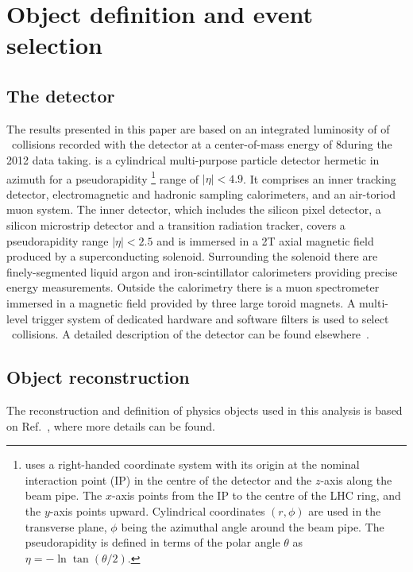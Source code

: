 \documentclass{atlasnote}
\begin{document}
\section{Object definition and event selection}
\label{sec:selection}

\subsection{The \ATLAS detector}
The results presented in this paper are based on an integrated luminosity of \Lumino of \proton\proton~collisions recorded with the \ATLAS detector at a center-of-mass energy of 8\TeV during the 2012 data taking. 
\ATLAS is a cylindrical multi-purpose particle detector hermetic in azimuth for a 
pseudorapidity%
\footnote{
\ATLAS uses a right-handed coordinate system with its origin at the nominal interaction point (IP) 
in the centre of the detector and the $z$-axis along the beam pipe. The $x$-axis points from the IP to the centre of the LHC ring, 
and the $y$-axis points upward. Cylindrical 
coordinates $(r, \phi)$ are used in the transverse plane, $\phi$ being the azimuthal angle around the beam pipe. 
The pseudorapidity is defined in terms of the polar angle $\theta$ as $\eta = - \ln \tan(\theta/2)$.
}
%
range of $|\eta|<4.9$. 
It comprises an inner tracking detector, electromagnetic and hadronic sampling calorimeters, and an air-toriod muon system. 
The inner detector, which includes the silicon pixel detector, a silicon microstrip detector and a transition radiation tracker, covers a pseudorapidity range 
$|\eta|<2.5$ and is immersed in a 2\unit{T} axial magnetic field produced by a 
superconducting solenoid. Surrounding the solenoid there are finely-segmented liquid argon and iron-scintillator calorimeters providing precise energy measurements. 
Outside the calorimetry there is a muon spectrometer immersed in a magnetic field provided by three large toroid magnets. 
A multi-level trigger system of dedicated hardware and software filters is used to select \proton\proton~collisions. 
A detailed description of the \ATLAS detector can be found elsewhere~\cite{ATLAS:JINST}.

\subsection{Object reconstruction}
\label{sec:OS}
The reconstruction and definition of physics objects used in this analysis is based on Ref.~\cite{ATLASConfNote:PUcorrection}, 
where more details can be found. 
\end{document}
